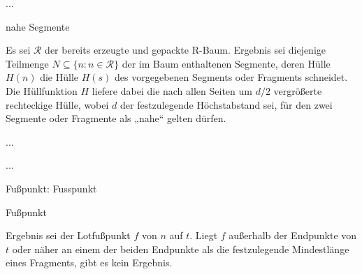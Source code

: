 \documentclass[../main/thesis.tex]{subfiles}
\begin{document}
...
\begin{algorithm}[H]
\caption{nahe Segmente}\label{alg:NaheSegmente}
\begin{algorithmic}
	\State Es sei $\mathcal{R}$ der bereits erzeugte und gepackte R-Baum. Ergebnis sei diejenige Teilmenge $N \subseteq \{n : n \in \mathcal{R}\}$ der im Baum enthaltenen Segmente, deren Hülle $H(n)$ die Hülle $H(s)$ des vorgegebenen Segments oder Fragments schneidet. Die Hüllfunktion $H$ liefere dabei die nach allen Seiten um $d/2$ vergrößerte rechteckige Hülle, wobei $d$ der festzulegende Höchstabstand sei, für den zwei Segmente oder Fragmente als „nahe“ gelten dürfen.
\EndFunction
\end{algorithmic}
\end{algorithm}



...


...


Fußpunkt: Fusspunkt

\begin{algorithm}[H]
\caption{Fußpunkt}\label{alg:Fusspunkt}
\begin{algorithmic}
	\State Ergebnis sei der Lotfußpunkt $f$ von $n$ auf $t$. Liegt $f$ außerhalb der Endpunkte von $t$ oder näher an einem der beiden Endpunkte als die festzulegende Mindestlänge eines Fragments, gibt es kein Ergebnis.
\EndFunction
\end{algorithmic}
\end{algorithm}
\end{document}
